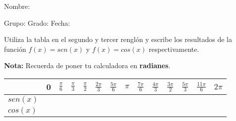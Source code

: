 \documentclass[12pt,addpoints]{exam}
\begin{document}

\vspace{5mm}

Nombre:\enspace\hrulefill

\vspace{5mm}

Grupo:\enspace\hrulefill
\enspace{}Grado:\enspace\hrulefill
\enspace{}Fecha:\enspace\hrulefill

\begin{questions}

\question Utiliza la tabla en el segundo y tercer renglón y escribe los
  resultados de la función $f(x) = sen(x)$ y $f(x) = cos(x)$ respectivamente.

  \textbf{Nota:} Recuerda de poner tu calculadora en \textbf{radianes}.

  \begin{tabular}{|l|c|c|c|c|c|c|c|c|c|c|c|c|c|}
    \hline & 0 & $\frac{\pi}{6}$  & $\frac{\pi}{3}$  & $\frac{\pi}{2}$ & $\frac{2\pi}{3}$%
               & $\frac{5\pi}{6}$ & $ \pi $  & $\frac{7\pi}{6}$ & $\frac{4\pi}{3}$%
               & $\frac{3\pi}{2}$  & $\frac{5\pi}{3}$ & $\frac{11\pi}{6}$ & $2\pi$ \\
    \hline $sen(x)$ & \hspace{7mm} & \hspace{7mm} & \hspace{7mm}
           & \hspace{7mm} & \hspace{7mm} & \hspace{7mm} & \hspace{7mm}
           & \hspace{7mm} & \hspace{7mm} & \hspace{7mm} & \hspace{7mm}
           & \hspace{7mm} & \hspace{7mm} \\
    \hline $cos(x)$ & \hspace{7mm} & \hspace{7mm} & \hspace{7mm}
           & \hspace{7mm} & \hspace{7mm} & \hspace{7mm} & \hspace{7mm}
           & \hspace{7mm} & \hspace{7mm} & \hspace{7mm} & \hspace{7mm}
           & \hspace{7mm} & \hspace{7mm} \\ \hline
  \end{tabular}


\end{questions}
\end{document}
